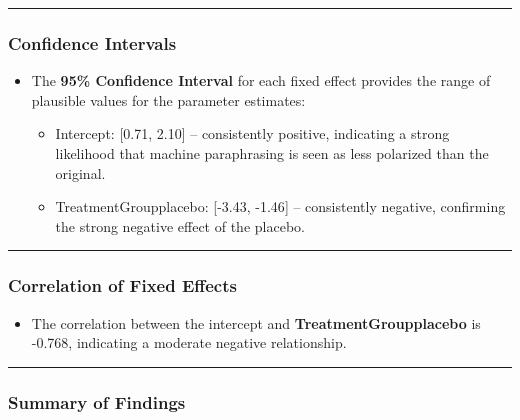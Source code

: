 \documentclass[
]{article}
\providecommand{\tightlist}{%
  \setlength{\itemsep}{0pt}\setlength{\parskip}{0pt}}
\begin{document}
\begin{center}\rule{0.5\linewidth}{0.5pt}\end{center}

\subsubsection{\texorpdfstring{\textbf{Confidence
Intervals}}{Confidence Intervals}}\label{confidence-intervals-1}

\begin{itemize}
\tightlist
\item
  The \textbf{95\% Confidence Interval} for each fixed effect provides
  the range of plausible values for the parameter estimates:

  \begin{itemize}
  \tightlist
  \item
    Intercept: {[}0.71, 2.10{]} -- consistently positive, indicating a
    strong likelihood that machine paraphrasing is seen as less
    polarized than the original.
  \item
    TreatmentGroupplacebo: {[}-3.43, -1.46{]} -- consistently negative,
    confirming the strong negative effect of the placebo.
  \end{itemize}
\end{itemize}

\begin{center}\rule{0.5\linewidth}{0.5pt}\end{center}

\subsubsection{\texorpdfstring{\textbf{Correlation of Fixed
Effects}}{Correlation of Fixed Effects}}\label{correlation-of-fixed-effects-1}

\begin{itemize}
\tightlist
\item
  The correlation between the intercept and
  \textbf{TreatmentGroupplacebo} is -0.768, indicating a moderate
  negative relationship.
\end{itemize}

\begin{center}\rule{0.5\linewidth}{0.5pt}\end{center}

\subsubsection{\texorpdfstring{\textbf{Summary of
Findings}}{Summary of Findings}}\label{summary-of-findings-1}
\end{document}
